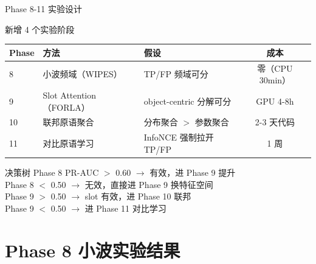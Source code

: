 \documentclass[aspectratio=169, 10pt]{beamer}
\begin{document}
\begin{frame}{Phase 8-11 实验设计}
  \begin{block}{新增 4 个实验阶段}
    \begin{tabular}{llp{5cm}c}
      \toprule
      \textbf{Phase} & \textbf{方法} & \textbf{假设} & \textbf{成本} \\
      \midrule
      8 & 小波频域（WIPES） & TP/FP 频域可分 & 零（CPU 30min） \\
      9 & Slot Attention（FORLA） & object-centric 分解可分 & GPU 4-8h \\
      10 & 联邦原语聚合 & 分布聚合 $>$ 参数聚合 & 2-3 天代码 \\
      11 & 对比原语学习 & InfoNCE 强制拉开 TP/FP & 1 周 \\
      \bottomrule
    \end{tabular}
  \end{block}
  \vspace{0em}
  \begin{block}{决策树}
    Phase 8 PR-AUC $>$ 0.60 $\to$ 有效，进 Phase 9 提升 \\
    Phase 8 $<$ 0.50 $\to$ 无效，直接进 Phase 9 换特征空间 \\
    Phase 9 $>$ 0.50 $\to$ slot 有效，进 Phase 10 联邦 \\
    Phase 9 $<$ 0.50 $\to$ 进 Phase 11 对比学习
  \end{block}
\end{frame}


\section{Phase 8 小波实验结果}
\end{document}
